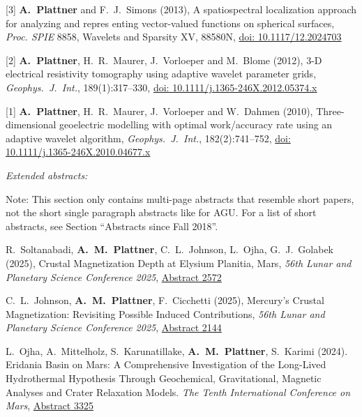 \documentclass[10pt]{article}
\begin{document}
\spcp
\hspace{-0.5cm}[3] \textbf{A.~Plattner} and F.~J.~Simons (2013), 
A spatiospectral localization approach for analyzing and repres enting vector-valued functions on spherical surfaces,
\emph{Proc. SPIE} 8858, Wavelets and Sparsity XV, 88580N,
\href{http://proceedings.spiedigitallibrary.org/proceeding.aspx?articleid=1745029}{doi: 10.1117/12.2024703}

\spcp
\hspace{-0.5cm}[2] \textbf{A.~Plattner}, H.~R.~Maurer, J.~Vorloeper and M.~Blome (2012),
3-D electrical resistivity tomography using adaptive wavelet parameter grids,
\emph{Geophys.~J.~Int.}, 189(1):317--330,
\href{https://academic.oup.com/gji/article-lookup/doi/10.1111/j.1365-246X.2012.05374.x}{doi: 10.1111/j.1365-246X.2012.05374.x}

\spcp
\hspace{-0.5cm}[1] \textbf{A.~Plattner}, H.~R.~Maurer, J.~Vorloeper and W.~Dahmen (2010),
Three-dimensional geoelectric modelling with optimal work/accuracy rate 
using an adaptive wavelet algorithm,
\emph{Geophys.~J.~Int.}, 182(2):741--752,
\href{https://academic.oup.com/gji/article-lookup/doi/10.1111/j.1365-246X.2010.04677.x}{doi: 10.1111/j.1365-246X.2010.04677.x}

\spc
\emph{Extended abstracts:}


\vspace{0.2cm}
Note: This section only contains multi-page abstracts that resemble short papers, not the short single paragraph abstracts like for AGU. For a list of short abstracts, see Section ``Abstracts since Fall 2018''.

\spcp
\grshift \gr[14] R.\ Soltanabadi, \textbf{A.~M.~Plattner}, C.\ L.\ Johnson, L.\ Ojha, G.\ J.\ Golabek (2025), Crustal Magnetization Depth at Elysium Planitia, Mars, \emph{56th Lunar and Planetary Science Conference 2025}, \href{https://www.hou.usra.edu/meetings/lpsc2025/pdf/2572.pdf}{Abstract 2572}

\spcp
\shift [13] C.\ L.\ Johnson, \textbf{A.~M.~Plattner}, F.\ Cicchetti  (2025), Mercury's Crustal Magnetization: Revisiting Possible Induced Contributions, \emph{56th Lunar and Planetary Science Conference 2025}, \href{https://www.hou.usra.edu/meetings/lpsc2025/pdf/2144.pdf}{Abstract 2144}

\spcp
\shift [12] L.\ Ojha, A.\ Mittelholz, S.\ Karunatillake, \textbf{A.\ M.\ Plattner}, S.\ Karimi (2024). Eridania Basin on Mars: A Comprehensive Investigation of the Long-Lived Hydrothermal Hypothesis Through Geochemical, Gravitational, Magnetic Analyses and Crater Relaxation Models. \emph{The Tenth International Conference on Mars}, \href{https://www.hou.usra.edu/meetings/tenthmars2024/pdf/3325.pdf}{Abstract 3325}
\end{document}
